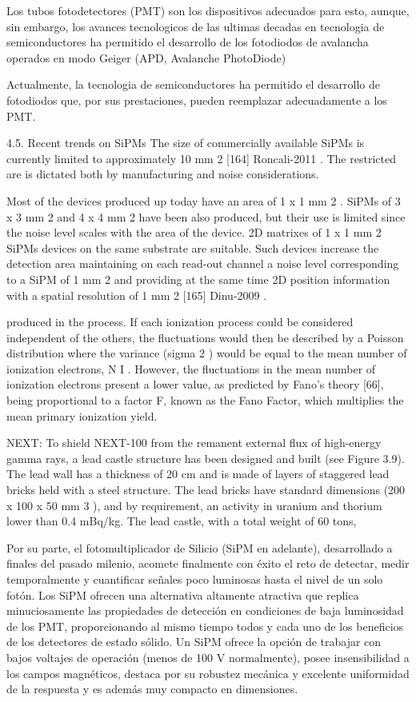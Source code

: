Los tubos fotodetectores (PMT) son los dispositivos adecuados para esto, aunque, sin embargo, los avances tecnologicos de las ultimas decadas en tecnologia de semiconductores ha permitido el desarrollo de los fotodiodos de avalancha operados en modo Geiger (APD, Avalanche PhotoDiode)

Actualmente, la tecnologia de semiconductores ha permitido el desarrollo de fotodiodos que, por sus prestaciones, pueden reemplazar adecuadamente a los PMT. 

4.5. Recent trends on SiPMs
The size of commercially available SiPMs is currently limited to approximately 10 mm 2 [164] Roncali-2011 . The restricted are is dictated both by manufacturing and noise considerations. 

Most of the devices produced up today have an area of 1 x 1 mm 2 . SiPMs of 3 x 3 mm 2 and 4 x 4 mm 2 have been also produced, but their use is limited since the noise level scales with the area of the device. 2D matrixes of 1 x 1 mm 2 SiPMs devices on the same substrate are suitable. Such devices increase the detection area maintaining on each read-out channel a noise level corresponding to a SiPM of 1 mm 2 and providing at the same time 2D position information with a spatial resolution of 1 mm 2 [165] Dinu-2009 .


produced in the process. If each ionization process could be considered independent of the others, the fluctuations would then be described by a Poisson distribution where the variance (sigma 2 ) would be equal to the mean number of ionization electrons, N I . However, the fluctuations in the mean number of ionization electrons present a lower value, as predicted by Fano’s theory [66], being proportional to a factor F, known as the Fano Factor, which multiplies the mean primary ionization yield. 

NEXT:
To shield NEXT-100 from the remanent external flux of high-energy gamma rays, a lead castle structure has been designed and built (see Figure 3.9). The lead wall has a thickness of 20 cm and is made of layers of staggered lead bricks held with a steel structure. The lead bricks have standard dimensions (200 x 100 x 50 mm 3 ), and by requirement, an activity in uranium and thorium lower than 0.4 mBq/kg. The lead castle, with a total weight of 60 tons,




Por su parte, el fotomultiplicador de Silicio (SiPM en adelante), desarrollado a finales del pasado milenio, acomete finalmente con éxito el reto de detectar, medir temporalmente y cuantificar señales poco luminosas hasta el nivel de un solo fotón. Los SiPM ofrecen una alternativa altamente atractiva que replica minuciosamente las propiedades de detección en condiciones de baja luminosidad de los PMT, proporcionando al mismo tiempo todos y cada uno de los beneficios de los detectores de estado sólido. Un SiPM ofrece la opción de trabajar con bajos voltajes de operación (menos de
100 V normalmente), posee insensibilidad a los campos magnéticos, destaca por su robustez mecánica y excelente uniformidad de la respuesta y es además muy compacto en dimensiones.